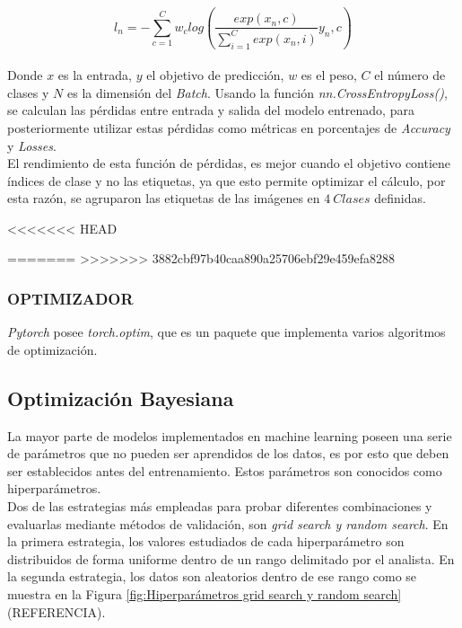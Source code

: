 			\begin{equation}
				{l_n=-\sum_{c=1}^{C}w_c log\left(\frac{exp(x_n,c)}{\sum_{i=1}^{C}exp(x_n,i)}y_n,c\right)}
			\end{equation}\\
			
			Donde $x$ es la entrada, $y$ el objetivo de predicción, $w$ es el peso, $C$ el número de clases y $N$ es la dimensión del \textit{Batch}. Usando la función \textit{nn.CrossEntropyLoss()}, se calculan las pérdidas entre entrada y salida del modelo entrenado, para posteriormente utilizar estas pérdidas como métricas en porcentajes de \textit{Accuracy} y \textit{Losses}.\\
			
			
			El rendimiento de esta función de pérdidas, es mejor cuando el objetivo contiene índices de clase y no las etiquetas, ya que esto permite optimizar el cálculo, por esta razón, se agruparon las etiquetas de las imágenes en $4 \ Clases$ definidas.
			
<<<<<<< HEAD
			
			
			
			
=======
>>>>>>> 3882cbf97b40caa890a25706ebf29e459efa8288
			\subsubsection{OPTIMIZADOR}
			
			\textit{Pytorch} posee \textit{torch.optim}, que es un paquete que implementa varios algoritmos de optimización. 
			
			
			
			
			

			
			
		\subsection{Optimización Bayesiana}
		La mayor parte de modelos implementados en machine learning poseen una serie de parámetros que no pueden ser aprendidos de los datos, es por esto que deben ser establecidos antes del entrenamiento. Estos parámetros son conocidos como hiperparámetros.\\
		
		Dos de las estrategias más empleadas para probar diferentes combinaciones y evaluarlas mediante métodos de validación, son \textit{grid search y random search}. En la primera estrategia, los valores estudiados de cada hiperparámetro son distribuidos de forma uniforme dentro de un rango delimitado por el analista. En la segunda estrategia, los datos son aleatorios dentro de ese rango como se muestra en la Figura \ref{fig:Hiperparámetros grid search y random search}	(REFERENCIA).
		

